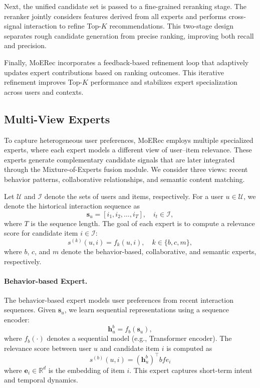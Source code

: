 \documentclass[sigconf,anonymous]{acmart}
\begin{document}
Next, the unified candidate set is passed to a fine-grained reranking stage. The reranker jointly considers features derived from all experts and performs cross-signal interaction to refine Top-$K$ recommendations. This two-stage design separates rough candidate generation from precise ranking, improving both recall and precision.

Finally, MoERec incorporates a feedback-based refinement loop that adaptively updates expert contributions based on ranking outcomes. This iterative refinement improves Top-$K$ performance and stabilizes expert specialization across users and contexts.

\subsection{Multi-View Experts}

To capture heterogeneous user preferences, MoERec employs multiple specialized experts, where each expert models a different view of user--item relevance. These experts generate complementary candidate signals that are later integrated through the Mixture-of-Experts fusion module. We consider three views: recent behavior patterns, collaborative relationships, and semantic content matching.

Let $\mathcal{U}$ and $\mathcal{I}$ denote the sets of users and items, respectively. For a user $u \in \mathcal{U}$, we denote the historical interaction sequence as
\begin{equation}
\mathbf{s}_u = [i_1, i_2, \ldots, i_T], \quad i_t \in \mathcal{I},
\end{equation}
where $T$ is the sequence length. The goal of each expert is to compute a relevance score for candidate item $i \in \mathcal{I}$:
\begin{equation}
s^{(k)}(u,i) = f_k(u,i), \quad k \in \{b,c,m\},
\end{equation}
where $b$, $c$, and $m$ denote the behavior-based, collaborative, and semantic experts, respectively.

\paragraph{Behavior-based Expert.}
The behavior-based expert models user preferences from recent interaction sequences. Given $\mathbf{s}_u$, we learn sequential representations using a sequence encoder:
\begin{equation}
\mathbf{h}_u^{b} = f_b(\mathbf{s}_u),
\end{equation}
where $f_b(\cdot)$ denotes a sequential model (e.g., Transformer encoder). The relevance score between user $u$ and candidate item $i$ is computed as
\begin{equation}
s^{(b)}(u,i) = (\mathbf{h}_u^{b})^\top bf{e}_i
\end{equation}
where $\mathbf{e}_i \in \mathbb{R}^d$ is the embedding of item $i$. This expert captures short-term intent and temporal dynamics.
\end{document}
